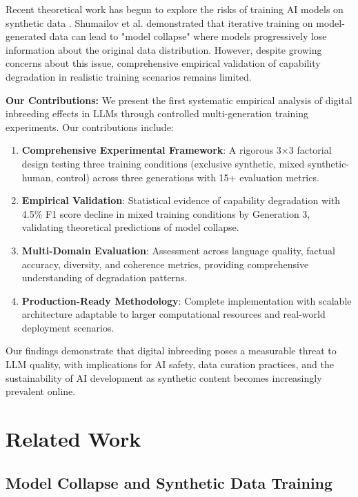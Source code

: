 \documentclass{article}
\begin{document}
Recent theoretical work has begun to explore the risks of training AI models on synthetic data \cite{shumailov2023curse, alemohammad2023self}. Shumailov et al. demonstrated that iterative training on model-generated data can lead to "model collapse" where models progressively lose information about the original data distribution. However, despite growing concerns about this issue, comprehensive empirical validation of capability degradation in realistic training scenarios remains limited.

\textbf{Our Contributions:} We present the first systematic empirical analysis of digital inbreeding effects in LLMs through controlled multi-generation training experiments. Our contributions include:

\begin{enumerate}
    \item \textbf{Comprehensive Experimental Framework}: A rigorous 3×3 factorial design testing three training conditions (exclusive synthetic, mixed synthetic-human, control) across three generations with 15+ evaluation metrics.
    
    \item \textbf{Empirical Validation}: Statistical evidence of capability degradation with 4.5\% F1 score decline in mixed training conditions by Generation 3, validating theoretical predictions of model collapse.
    
    \item \textbf{Multi-Domain Evaluation}: Assessment across language quality, factual accuracy, diversity, and coherence metrics, providing comprehensive understanding of degradation patterns.
    
    \item \textbf{Production-Ready Methodology}: Complete implementation with scalable architecture adaptable to larger computational resources and real-world deployment scenarios.
\end{enumerate}

Our findings demonstrate that digital inbreeding poses a measurable threat to LLM quality, with implications for AI safety, data curation practices, and the sustainability of AI development as synthetic content becomes increasingly prevalent online.

\section{Related Work}

\subsection{Model Collapse and Synthetic Data Training}
\end{document}
